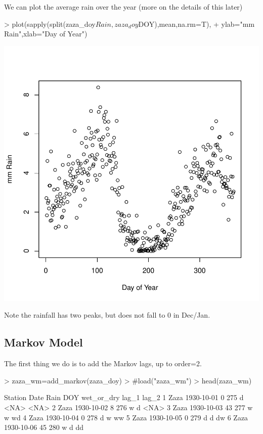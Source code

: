 \documentclass{article}
\begin{document}
We can plot the average rain over the year (more on the details
of this later)
\begin{Schunk}
\begin{Sinput}
>  plot(sapply(split(zaza_doy$Rain,zaza_doy$DOY),mean,na.rm=T),
+       ylab="mm Rain",xlab="Day of Year")
\end{Sinput}
\end{Schunk}
\includegraphics{climate_vignette-004}

Note the rainfall has two peaks, but does not fall to 0 in Dec/Jan.

\subsection{Markov Model}
The first thing we do is to add the Markov lags, up to order=2.

\begin{Schunk}
\begin{Sinput}
> zaza_wm=add_markov(zaza_doy)
> #load("zaza_wm")
> head(zaza_wm)
\end{Sinput}
\begin{Soutput}
  Station       Date Rain DOY wet_or_dry lag_1 lag_2
1    Zaza 1930-10-01    0 275          d  <NA>  <NA>
2    Zaza 1930-10-02    8 276          w     d  <NA>
3    Zaza 1930-10-03   43 277          w     w    wd
4    Zaza 1930-10-04    0 278          d     w    ww
5    Zaza 1930-10-05    0 279          d     d    dw
6    Zaza 1930-10-06   45 280          w     d    dd
\end{Soutput}
\end{Schunk}
\end{document}
